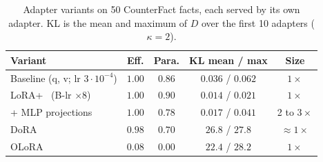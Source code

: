 \begin{table}[t]
\centering
\caption{Adapter variants on 50 CounterFact facts, each served by its own adapter.
KL is the mean and maximum of $D$ over the first 10 adapters ($\kappa=2$).}
\label{tab:recipes}
\footnotesize
\setlength{\tabcolsep}{4pt}
\begin{tabular}{lcccc}
\toprule
Variant & Eff. & Para. & KL mean / max & Size \\
\midrule
Baseline (q, v; lr $3{\cdot}10^{-4}$) & $1.00$ & $0.86$ & $0.036$ / $0.062$ & $1\times$ \\
LoRA+~\cite{hayou2024loraplus} (B-lr $\times 8$) & $1.00$ & $0.90$ & $0.014$ / $0.021$ & $1\times$ \\
+ MLP projections & $1.00$ & $0.78$ & $0.017$ / $0.041$ & 2 to $3\times$ \\
DoRA~\cite{liu2024dora} & $0.98$ & $0.70$ & $26.8$ / $27.8$ & $\approx 1\times$ \\
OLoRA~\cite{buyukakyuz2024olora} & $0.08$ & $0.00$ & $22.4$ / $28.2$ & $1\times$ \\
\bottomrule
\end{tabular}
\end{table}
